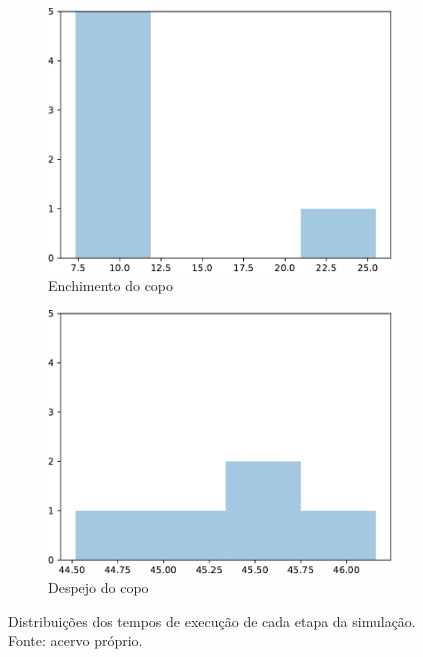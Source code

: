 \documentclass[12pt]{article}
\begin{document}
\begin{figure}[h]
     \null\hfill
     \begin{subfigure}[b]{0.32\textwidth}%
         \centering
         \includegraphics[width=\textwidth]{figuras/enchimento_copo}
         \caption{Enchimento do copo}
         \label{fig:hist_enchimento_copo}
     \end{subfigure}%
     \hspace{4pt}
     \begin{subfigure}[b]{0.32\textwidth}%
         \centering
         \includegraphics[width=\textwidth]{figuras/despejo_copo}
         \caption{Despejo do copo}
         \label{fig:hist_despejo_copo}
     \end{subfigure}%
     \hfill\null
    
    \caption{Distribuições dos tempos de execução de cada etapa da simulação. Fonte: acervo próprio.}
    \label{fig:hist}
\end{figure}
\end{document}
